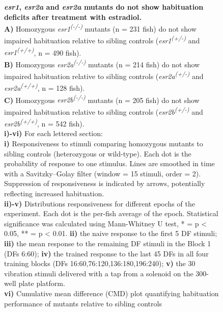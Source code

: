 \documentclass[9.5pt,lineno]{RandlettLab_elife}
\begin{document}
{\begin{figure}
\internallinenumbers
\begin{center}
\caption{\textbf{\emph{esr1}, \emph{esr2a} and \emph{esr2a} mutants do not show habituation deficits after treatment with estradiol.} \doublespacing
\\ \textbf{A)} Homozygous \emph{esr1\textsuperscript{(-/-)}} mutants (n = 231 fish) do not show impaired habituation relative to sibling controls (\emph{esr1\textsuperscript{(+/-)}} and \emph{esr1\textsuperscript{(+/+)}}, n = 490 fish). 
\\ \textbf{B)} Homozygous \emph{esr2a\textsuperscript{(-/-)}} mutants (n = 214 fish) do not show impaired habituation relative to sibling controls (\emph{esr2a\textsuperscript{(+/-)}} and \emph{esr2a\textsuperscript{(+/+)}}, n = 128 fish).
\\ \textbf{C)} Homozygous \emph{esr2b\textsuperscript{(-/-)}} mutants (n = 205 fish) do not show impaired habituation relative to sibling controls (\emph{esr2b\textsuperscript{(+/-)}} and \emph{esr2b\textsuperscript{(+/+)}}, n = 542 fish). 
\\ \textbf{i)-vi)} For each lettered section: 
\\ \textbf{i)} Responsiveness to stimuli comparing homozygous mutants to sibling controls (heterozygous or wild-type). 
Each dot is the probability of response to one stimulus. Lines are smoothed in time with a Savitzky–Golay filter (window = 15 stimuli, order = 2). 
Suppression of responsiveness is indicated by arrows, potentially reflecting increased habituation.
\\ \textbf{ii)-v)} Distributions responsiveness for different epochs of the experiment. Each dot is the per-fish average of the epoch. 
Statistical significance was calculated using Mann-Whitney U test, * = p < 0.05, ** = p < 0.01.
\textbf{ii)} the naive response to the first 5 DF stimuli; \textbf{iii)} the mean response to the remaining DF stimuli in the Block 1 (DFs 6:60); \textbf{iv)} the trained response to the last 45 DFs in all four training blocks (DFs 16:60,76:120,136:180,196:240); \textbf{v)} the 30 vibration stimuli delivered with a tap from a solenoid on the 300-well plate platform.
\\ \textbf{vi)} Cumulative mean difference (CMD) plot quantifying habituation performance of mutants relative to sibling controls
}

\label{fig:3}

\end{center}
\endinternallinenumbers
\end{figure}



}
\end{document}
